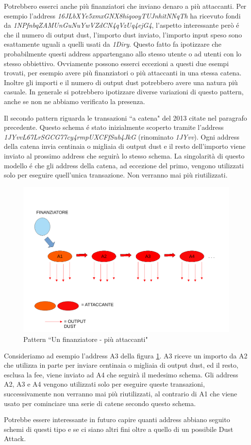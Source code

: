 Potrebbero esserci anche più finanziatori che inviano denaro a più attaccanti. Per esempio l'address \textit{16JLbXYe5xmxGNX8hiqooyTUJnhitNNqTh} ha ricevuto fondi da \textit{1NPfnbqZAMUnGuNuYwVZdCN4qVzUq4ejG4}, l'aspetto interessante però é che il numero di output dust, l'importo dust inviato, l'importo input speso sono esattamente uguali a quelli usati da \textit{1Diry}. Questo fatto fa ipotizzare che probabilmente questi address appartengano allo stesso utente o ad utenti con lo stesso obbiettivo. Ovviamente possono esserci eccezioni a questi due esempi trovati, per esempio avere più finanziatori o più attaccanti in una stessa catena. Inoltre gli importi e il numero di output dust potrebbero avere una natura più casuale. In generale si potrebbero ipotizzare diverse variazioni di questo pattern, anche se non ne abbiamo verificato la presenza.

Il secondo pattern riguarda le transazioni ``a catena" del 2013 citate nel paragrafo precedente. Questo schema é stato inizialmente scoperto tramite l'address \textit{1JYvvL67LrSGCG77cy4rmpUXCFfSub4JkG} (rinominato \textit{1JYvv}). Ogni address della catena invia centinaia o migliaia di output dust e il resto dell'importo viene inviato al prossimo address che seguirà lo stesso schema. La singolarità di questo modello é che gli address della catena, ad eccezione del primo, vengono utilizzati solo per eseguire quell'unica transazione. Non verranno mai più riutilizzati.
\begin{figure}[h!]
    \centering
    \includegraphics[scale=0.4]{Images/dust_attack2.pdf}
    \caption{Pattern ``Un finanziatore - più attaccanti"}
    \label{fig:schema2}
\end{figure}
\FloatBarrier
Consideriamo ad esempio l'address A3 della figura \ref{fig:schema2}. A3 riceve un importo da A2 che utilizza in parte per inviare centinaia o migliaia di output dust, ed il resto, esclusa la fee, viene inviato ad A4 che seguirà il medesimo schema. Gli address A2, A3 e A4 vengono utilizzati solo per eseguire queste transazioni, successivamente non verranno mai più riutilizzati, al contrario di A1 che viene usato per cominciare una serie di catene secondo questo schema.

Potrebbe essere interessante in futuro capire quanti address abbiano seguito schemi di questi tipo e se ci siano altri fini oltre a quello di un possibile Dust Attack.